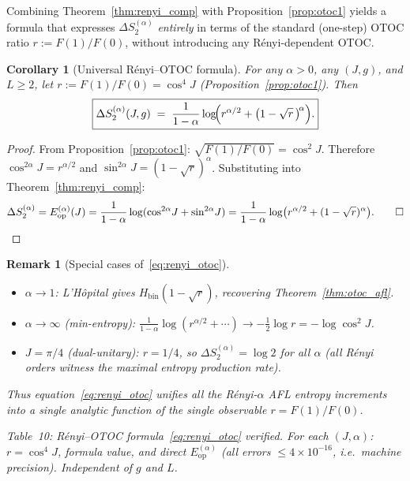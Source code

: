 \documentclass[12pt,a4paper]{article}
\newtheorem{corollary}[theorem]{Corollary}
\newtheorem{remark}[theorem]{Remark}
\begin{document}
Combining Theorem~\ref{thm:renyi_comp} with Proposition~\ref{prop:otoc1} yields
a formula that expresses $\Delta S^{(\alpha)}_2$ \emph{entirely} in terms of the
standard (one-step) OTOC ratio $r := F(1)/F(0)$, without introducing any
Rényi-dependent OTOC.

\begin{corollary}[Universal Rényi--OTOC formula]\label{cor:renyi_otoc}
For any $\alpha>0$, any $(J,g)$, and $L\ge 2$, let $r := F(1)/F(0) = \cos^4\!J$
(Proposition~\ref{prop:otoc1}).  Then
\begin{equation}\label{eq:renyi_otoc}
  \boxed{\Delta S^{(\alpha)}_2(J,g)
  \;=\; \frac{1}{1-\alpha}\log\!\Bigl(r^{\alpha/2}
  + \bigl(1 - \sqrt{r}\,\bigr)^{\!\alpha}\Bigr).}
\end{equation}
\end{corollary}

\begin{proof}
From Proposition~\ref{prop:otoc1}: $\sqrt{F(1)/F(0)} = \cos^2\!J$.
Therefore $\cos^{2\alpha}\!J = r^{\alpha/2}$ and $\sin^{2\alpha}\!J = (1-\sqrt{r})^\alpha$.
Substituting into Theorem~\ref{thm:renyi_comp}:
\[
  \Delta S^{(\alpha)}_2 = E^{(\alpha)}_\mathrm{op}(J)
  = \frac{1}{1-\alpha}\log(\cos^{2\alpha}\!J + \sin^{2\alpha}\!J)
  = \frac{1}{1-\alpha}\log\bigl(r^{\alpha/2} + (1-\sqrt{r})^\alpha\bigr).\qed
\]
\end{proof}

\begin{remark}[Special cases of~\eqref{eq:renyi_otoc}]
\leavevmode\vspace{-0.5em}
\begin{itemize}
\item $\alpha\to 1$: L'Hôpital gives $H_\mathrm{bin}(1-\sqrt{r})$, recovering
  Theorem~\ref{thm:otoc_afl}.
\item $\alpha\to\infty$ (min-entropy): $\frac{1}{1-\alpha}\log(r^{\alpha/2}+\cdots)
  \to -\tfrac{1}{2}\log r = -\log\cos^2\!J$.
\item $J=\pi/4$ (dual-unitary): $r=1/4$, so $\Delta S^{(\alpha)}_2 = \log 2$ for
  \emph{all} $\alpha$ (all Rényi orders witness the maximal entropy production rate).
\end{itemize}
Thus equation~\eqref{eq:renyi_otoc} unifies all the Rényi-$\alpha$ AFL
entropy increments into a single analytic function of the single observable
$r = F(1)/F(0)$.
\end{remark}

\noindent\textit{Table~10: Rényi--OTOC formula~\eqref{eq:renyi_otoc} verified.
For each $(J,\alpha)$: $r = \cos^4\!J$, formula value, and direct $E^{(\alpha)}_\mathrm{op}$
(all errors $\le 4\times 10^{-16}$, i.e.\ machine precision). Independent of $g$ and $L$.}
\end{document}
